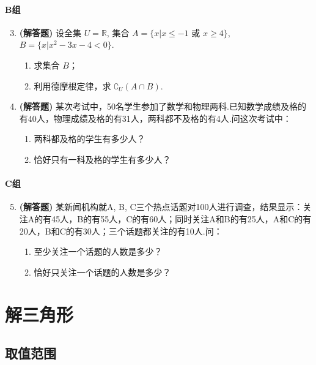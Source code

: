\documentclass[12pt,a4paper]{ctexbook}
\theoremstyle{definition}
\theoremstyle{remark}
\begin{document}
	\subsubsection*{B组}
	\begin{enumerate}
		\setcounter{enumi}{2}
		\item \textbf{(解答题)} 设全集 $U=\mathbb{R}$, 集合 $A=\{x|x \le -1 \text{ 或 } x \ge 4\}$, $B=\{x| x^2-3x-4<0\}$.
		\begin{enumerate}
			\item 求集合 $B$；
			\item 利用德摩根定律，求 $\complement_U(A \cap B)$.
		\end{enumerate}
		
		\item \textbf{(解答题)} 某次考试中，50名学生参加了数学和物理两科.已知数学成绩及格的有40人，物理成绩及格的有31人，两科都不及格的有4人.问这次考试中：
		\begin{enumerate}
			\item 两科都及格的学生有多少人？
			\item 恰好只有一科及格的学生有多少人？
		\end{enumerate}
	\end{enumerate}
	
	\subsubsection*{C组}
	\begin{enumerate}
		\setcounter{enumi}{4}
		\item \textbf{(解答题)} 某新闻机构就A, B, C三个热点话题对100人进行调查，结果显示：关注A的有45人，B的有55人，C的有60人；同时关注A和B的有25人，A和C的有20人，B和C的有30人；三个话题都关注的有10人.问：
		\begin{enumerate}
			\item 至少关注一个话题的人数是多少？
			\item 恰好只关注一个话题的人数是多少？
		\end{enumerate}
	\end{enumerate}
	
	\chapter{解三角形}
	
	\section{取值范围}
\end{document}
